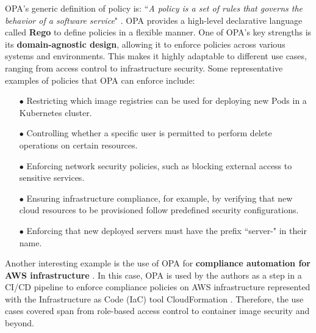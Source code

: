 OPA's generic definition of policy is: ``\textit{A policy is a set of rules that governs the behavior of a software service}" \cite{opa_philosophy}. OPA provides a high-level declarative language called \textbf{Rego} to define policies in a flexible manner. 
One of OPA's key strengths is its \textbf{domain-agnostic design}, allowing it to enforce policies across various systems and environments. 
This makes it highly adaptable to different use cases, ranging from access control to infrastructure security. 
Some representative examples of policies that OPA can enforce include:

\begin{itemize}[itemsep=0.2pt, topsep=1pt] \item[$\bullet$] Restricting which image registries can be used for deploying new Pods in a Kubernetes cluster.
\item[$\bullet$] Controlling whether a specific user is permitted to perform delete operations on certain resources.
\item[$\bullet$] Enforcing network security policies, such as blocking external access to sensitive services.
\item[$\bullet$] Ensuring infrastructure compliance, for example, by verifying that new cloud resources to be provisioned follow predefined security configurations.
\item[$\bullet$] Enforcing that new deployed servers must have the prefix ``server-" in their name.
\end{itemize}

Another interesting example is the use of OPA for \textbf{compliance automation for AWS infrastructure} \cite{10612535}. 
In this case, OPA is used by the authors as a step in a CI/CD pipeline to enforce compliance policies on AWS infrastructure represented with the Infrastructure as Code (IaC) tool CloudFormation \cite{10612535}.
Therefore, the use cases covered span from role-based access control to container image security and beyond.
\newline

